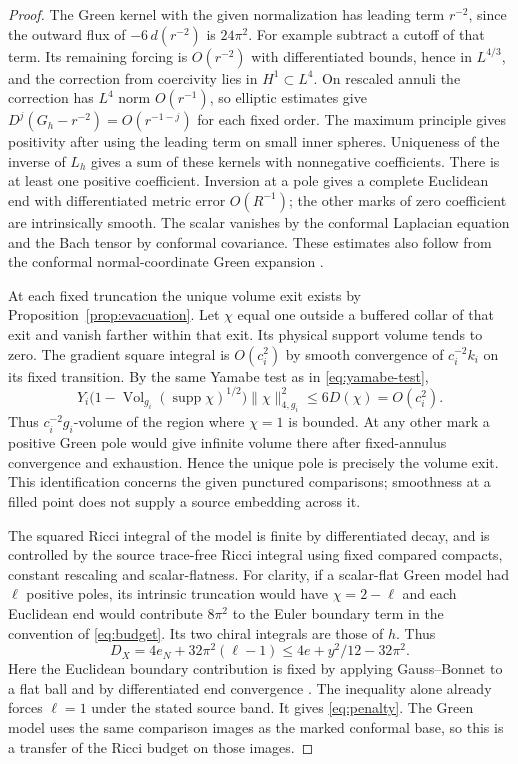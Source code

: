 \documentclass[11pt]{article}
\theoremstyle{definition}
\theoremstyle{remark}
\begin{document}
\begin{proof}
The Green kernel with the given normalization has leading term \(r^{-2}\), since the outward flux of \(-6\,d(r^{-2})\) is \(24\pi^2\). For example subtract a cutoff of that term. Its remaining forcing is \(O(r^{-2})\) with differentiated bounds, hence in \(L^{4/3}\), and the correction from coercivity lies in \(H^1\subset L^4\). On rescaled annuli the correction has \(L^4\) norm \(O(r^{-1})\), so elliptic estimates give \(D^j(G_h-r^{-2})=O(r^{-1-j})\) for each fixed order. The maximum principle gives positivity after using the leading term on small inner spheres. Uniqueness of the inverse of \(L_h\) gives a sum of these kernels with nonnegative coefficients. There is at least one positive coefficient. Inversion at a pole gives a complete Euclidean end with differentiated metric error \(O(R^{-1})\); the other marks of zero coefficient are intrinsically smooth. The scalar vanishes by the conformal Laplacian equation and the Bach tensor by conformal covariance. These estimates also follow from the conformal normal-coordinate Green expansion \cite[Lemma 6.4 and Theorem 6.5]{LeeParker1987Yamabe}.

At each fixed truncation the unique volume exit exists by Proposition~\ref{prop:evacuation}. Let \(\chi\) equal one outside a buffered collar of that exit and vanish farther within that exit. Its physical support volume tends to zero. The gradient square integral is \(O(c_i^2)\) by smooth convergence of \(c_i^{-2}k_i\) on its fixed transition. By the same Yamabe test as in \eqref{eq:yamabe-test},
\[
 Y_i\big(1-\operatorname{Vol}_{g_i}(\operatorname{supp}\chi)^{1/2}\big)
       \|\chi\|_{4,g_i}^2\le6D(\chi)=O(c_i^2).
\]
Thus \(c_i^{-2}g_i\)-volume of the region where \(\chi=1\) is bounded. At any other mark a positive Green pole would give infinite volume there after fixed-annulus convergence and exhaustion. Hence the unique pole is precisely the volume exit. This identification concerns the given punctured comparisons; smoothness at a filled point does not supply a source embedding across it.

The squared Ricci integral of the model is finite by differentiated decay, and is controlled by the source trace-free Ricci integral using fixed compared compacts, constant rescaling and scalar-flatness. For clarity, if a scalar-flat Green model had \(\ell\) positive poles, its intrinsic truncation would have \(\chi=2-\ell\) and each Euclidean end would contribute \(8\pi^2\) to the Euler boundary term in the convention of \eqref{eq:budget}. Its two chiral integrals are those of \(h\). Thus
\[
 D_X=4e_N+32\pi^2(\ell-1)\le 4e+y^2/12-32\pi^2 .
\]
Here the Euclidean boundary contribution is fixed by applying Gauss--Bonnet to a flat ball and by differentiated end convergence \cite[\S7]{TianViaclovsky2005ALE}. The inequality alone already forces \(\ell=1\) under the stated source band. It gives \eqref{eq:penalty}. The Green model uses the same comparison images as the marked conformal base, so this is a transfer of the Ricci budget on those images.
\end{proof}
\end{document}
